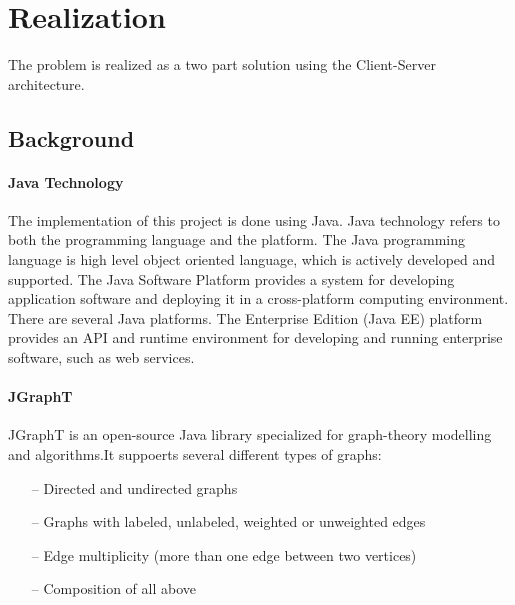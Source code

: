 \setchapterpreamble[u]%

\chapter{Realization} \label{chap:Realization}
\minitoc\vspace{1em}

The problem is realized as a two part solution using the Client-Server architecture.


\section{Background}

\subsubsection{Java Technology}
The implementation of this project is done using Java\cite{??}.
Java technology refers to both the programming language and the platform.
The Java programming language is high level object oriented language\cite{Gosling:2014:JLS:2636997}, 
which is actively developed and supported. 
The Java Software Platform provides a system for developing application software and deploying it in a cross-platform computing environment. 
There are several Java platforms.
The Enterprise Edition (Java EE) platform provides an API and runtime environment for developing and running enterprise software, such as web services.

\subsubsection{JGraphT}

JGraphT is an open-source Java library specialized for graph-theory modelling and algorithms.It suppoerts several different types of graphs\cite{JGraphT}:
\begin{itemize}
	\item[--] Directed and undirected graphs
	\item[--] Graphs with labeled, unlabeled, weighted or unweighted edges
	\item[--] Edge multiplicity (more than one edge between two vertices)
	\item[--] Composition of all above
\end{itemize}

